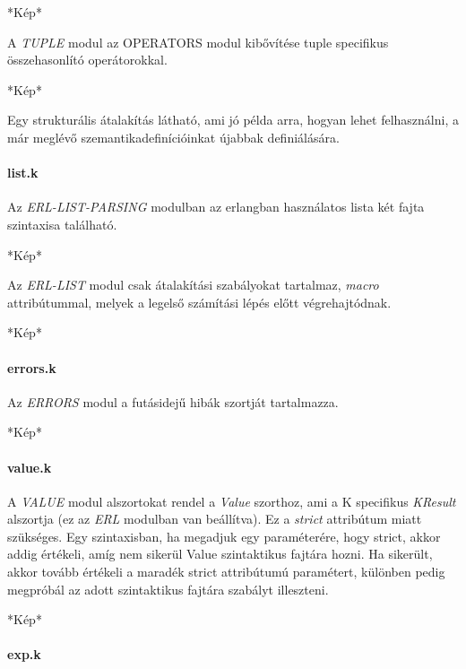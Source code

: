 *Kép*

A \textit{TUPLE} modul az OPERATORS modul kibővítése tuple specifikus összehasonlító operátorokkal.

*Kép*

Egy strukturális átalakítás látható, ami jó példa arra, hogyan lehet felhasználni, a már meglévő szemantikadefinícióinkat újabbak definiálására.

\paragraph{list.k}

Az \textit{ERL-LIST-PARSING} modulban az erlangban használatos lista két fajta szintaxisa található.

*Kép*

Az \textit{ERL-LIST} modul csak átalakítási szabályokat tartalmaz, \textit{macro} attribútummal, melyek a legelső számítási lépés előtt végrehajtódnak.

*Kép*

\paragraph{errors.k}

Az \textit{ERRORS} modul a futásidejű hibák szortját tartalmazza.

*Kép*

\paragraph{value.k}

A \textit{VALUE} modul alszortokat rendel a \textit{Value} szorthoz, ami a K specifikus \textit{KResult} alszortja (ez az \textit{ERL} modulban van beállítva). Ez a \textit{strict} attribútum miatt szükséges. Egy szintaxisban, ha megadjuk egy paraméterére, hogy strict, akkor addig értékeli, amíg nem sikerül Value szintaktikus fajtára hozni. Ha sikerült, akkor tovább értékeli a maradék strict attribútumú paramétert, különben pedig megpróbál az adott szintaktikus fajtára szabályt illeszteni.

*Kép*


\paragraph{exp.k}

